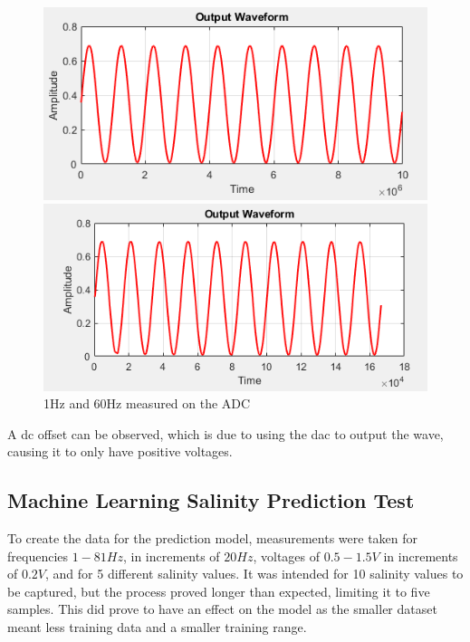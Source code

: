 \begin{figure}[H]
    \centering
    \begin{minipage}[t]{0.48\textwidth}
        \centering
        \includegraphics[width=\linewidth]{Figures/adc_1hz.png}
    \end{minipage}
    \hfill
    \begin{minipage}[t]{0.48\textwidth}
        \centering
        \includegraphics[width=\linewidth]{Figures/adc_60hz.png}
    \end{minipage}
    \caption{1Hz and 60Hz measured on the ADC}
    \label{fig:adc_sine}
\end{figure}

A \gls{dc} offset can be observed, which is due to using the \gls{dac} to output the wave, causing it to only have positive voltages.

\subsection{Machine Learning Salinity Prediction Test}
To create the data for the prediction model, measurements were taken for frequencies $1-81Hz$, in increments of $20Hz$, voltages of $0.5-1.5V$ in increments of $0.2V$, and for 5 different salinity values.
It was intended for 10 salinity values to be captured, but the process proved longer than expected, limiting it to five samples.
This did prove to have an effect on the model as the smaller dataset meant less training data and a smaller training range.

